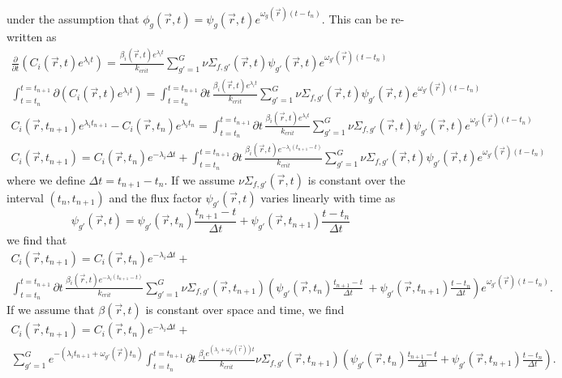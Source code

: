 \documentclass[12pt]{report}
\begin{document}
	under the assumption that $\phi_g(\vec{r},t) = \psi_g(\vec{r},t) e^{\omega_g(\vec{r}) (t-t_n)}$. This can be re-written as
	\begin{eqnarray}
	\frac{\partial}{\partial t} \left( C_i(\vec{r},t) e^{\lambda_i t} \right) = \frac{\beta_i(\vec{r},t) e^{\lambda_i t}}{k_{crit}} \sum_{g'=1}^{G} \nu \Sigma_{f,g'}(\vec{r},t) \psi_{g'}(\vec{r},t) e^{\omega_{g'}(\vec{r}) (t-t_n)} \nonumber \\
	\int_{t=t_n}^{t=t_{n+1}} \partial \left( C_i(\vec{r},t) e^{\lambda_i t} \right) = \int_{t=t_n}^{t=t_{n+1}}  \partial t \, \frac{\beta_i(\vec{r},t) e^{\lambda_i t}}{k_{crit}} \sum_{g'=1}^{G} \nu \Sigma_{f,g'}(\vec{r},t) \psi_{g'}(\vec{r},t) e^{\omega_{g'}(\vec{r}) (t-t_n)} \nonumber \\
	 C_i(\vec{r},t_{n+1}) e^{\lambda_i t_{n+1}} - C_i(\vec{r},t_{n}) e^{\lambda_i t_{n}} = \int_{t=t_n}^{t=t_{n+1}}  \partial t \, \frac{\beta_i(\vec{r},t) e^{\lambda_i t}}{k_{crit}} \sum_{g'=1}^{G} \nu \Sigma_{f,g'}(\vec{r},t) \psi_{g'}(\vec{r},t) e^{\omega_{g'}(\vec{r}) (t-t_n)} \nonumber \\
	 C_i(\vec{r},t_{n+1}) =  C_i(\vec{r},t_{n}) e^{-\lambda_i \Delta t} +  \int_{t=t_n}^{t=t_{n+1}}  \partial t \, \frac{\beta_i(\vec{r},t) e^{-\lambda_i \left(t_{n+1} - t \right)}}{k_{crit}} \sum_{g'=1}^{G} \nu \Sigma_{f,g'}(\vec{r},t) \psi_{g'}(\vec{r},t) e^{\omega_{g'}(\vec{r}) (t-t_n)} \nonumber
	\end{eqnarray}	
	where we define $\Delta t = t_{n+1} - t_n$. If we assume $\nu \Sigma_{f,g'}(\vec{r},t)$ is constant over the interval $(t_n, t_{n+1})$ and the flux factor $\psi_{g'}(\vec{r},t)$ varies linearly with time as
	\begin{equation}
	\psi_{g'}(\vec{r},t) = \psi_{g'}(\vec{r},t_n) \frac{t_{n+1}-t}{\Delta t} + \psi_{g'}(\vec{r},t_{n+1}) \frac{t-t_n}{\Delta t} 
	\end{equation}
	we find that
	\begin{eqnarray}
	C_i(\vec{r},t_{n+1}) =  C_i(\vec{r},t_{n}) e^{-\lambda_i \Delta t} + \nonumber \\  \int_{t=t_n}^{t=t_{n+1}}  \partial t \, \frac{\beta_i(\vec{r},t) e^{-\lambda_i \left(t_{n+1} - t \right)}}{k_{crit}} \sum_{g'=1}^{G} \nu \Sigma_{f,g'}(\vec{r},t_{n+1}) \left( \psi_{g'}(\vec{r},t_n) \frac{t_{n+1}-t}{\Delta t} \ + \psi_{g'}(\vec{r},t_{n+1}) \frac{t-t_n}{\Delta t} \right) e^{\omega_{g'}(\vec{r}) (t-t_n)}. \nonumber
	\end{eqnarray}
	If we assume that $\beta(\vec{r},t)$ is constant over space and time, we find
	\begin{eqnarray}
	C_i(\vec{r},t_{n+1}) =  C_i(\vec{r},t_{n}) e^{-\lambda_i \Delta t} + \nonumber \\  \sum_{g'=1}^{G} e^{-\left(\lambda_i t_{n+1} + \omega_{g'}(\vec{r})t_n \right)} \int_{t=t_n}^{t=t_{n+1}}  \partial t \, \frac{\beta_i e^{\left(\lambda_i + \omega_{g'}(\vec{r}) \right)  t}}{k_{crit}}  \nu \Sigma_{f,g'}(\vec{r},t_{n+1}) \left( \psi_{g'}(\vec{r},t_n) \frac{t_{n+1}-t}{\Delta t} + \psi_{g'}(\vec{r},t_{n+1}) \frac{t-t_n}{\Delta t}  \right). \nonumber
	\end{eqnarray}
\end{document}
